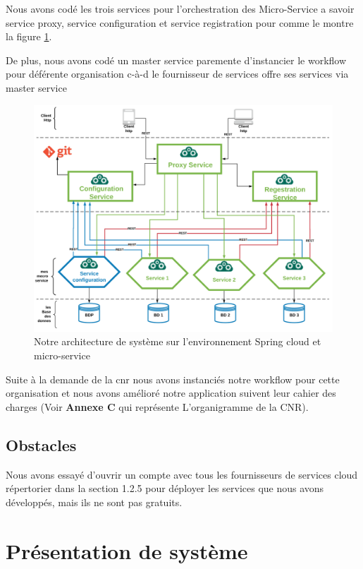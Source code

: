  
    Nous avons codé  les trois services pour l'orchestration des Micro-Service a  savoir service proxy, service  configuration et service   registration   pour  comme le montre  la figure \ref{fig:cloudms}.
    
De plus, nous avons codé un master service paremente d'instancier le workflow pour déférente organisation c-à-d le fournisseur de services offre ses services via master service
 \begin{figure}[H]
 	\centering
 	\includegraphics[width=1\linewidth]{images/cloudMS}
 	\caption{Notre architecture de système sur l'environnement Spring cloud et micro-service}
 	\label{fig:cloudms}
 \end{figure}
 
     Suite à la demande de la \ac{cnr} nous avons instanciés notre workflow pour cette organisation et nous avons amélioré notre application suivent  leur  cahier des charges  (Voir \textbf{Annexe C} qui représente  L'organigramme de la CNR).  
     
          
\subsection{Obstacles}
Nous avons essayé d'ouvrir un compte avec tous les fournisseurs de services cloud répertorier dans la section 1.2.5 pour déployer les services que nous avons développés, mais ils ne sont pas gratuits.

 
  
  
 \section{Présentation de système }

